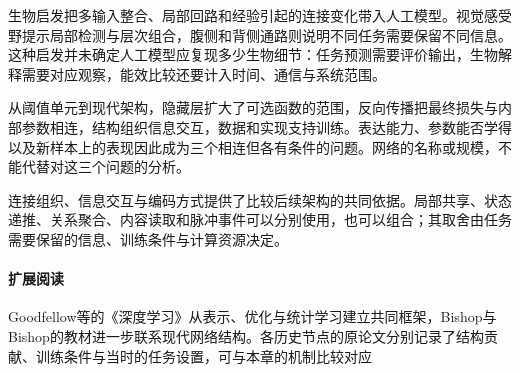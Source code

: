 生物启发把多输入整合、局部回路和经验引起的连接变化带入人工模型。视觉感受野提示局部检测与层次组合，腹侧和背侧通路则说明不同任务需要保留不同信息。这种启发并未确定人工模型应复现多少生物细节：任务预测需要评价输出，生物解释需要对应观察，能效比较还要计入时间、通信与系统范围。

从阈值单元到现代架构，隐藏层扩大了可选函数的范围，反向传播把最终损失与内部参数相连，结构组织信息交互，数据和实现支持训练。表达能力、参数能否学得以及新样本上的表现因此成为三个相连但各有条件的问题。网络的名称或规模，不能代替对这三个问题的分析。

连接组织、信息交互与编码方式提供了比较后续架构的共同依据。局部共享、状态递推、关系聚合、内容读取和脉冲事件可以分别使用，也可以组合；其取舍由任务需要保留的信息、训练条件与计算资源决定。

\paragraph{扩展阅读}
Goodfellow等的《深度学习》从表示、优化与统计学习建立共同框架，Bishop与Bishop的教材进一步联系现代网络结构。各历史节点的原论文分别记录了结构贡献、训练条件与当时的任务设置，可与本章的机制比较对应
